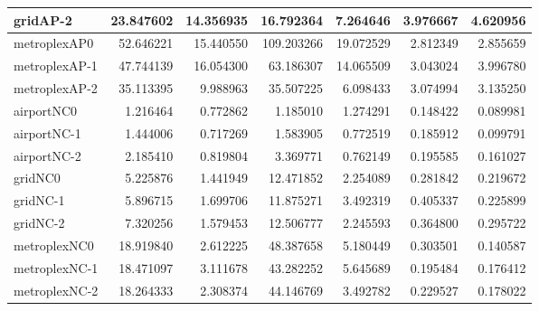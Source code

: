 \begin{longtable}{|l|r|r|r|r|r|r|}
gridAP-2 & 23.847602 & 14.356935 & 16.792364 & 7.264646 & 3.976667 & 4.620956 \\ \hline
metroplexAP0 & 52.646221 & 15.440550 & 109.203266 & 19.072529 & 2.812349 & 2.855659 \\ \hline
metroplexAP-1 & 47.744139 & 16.054300 & 63.186307 & 14.065509 & 3.043024 & 3.996780 \\ \hline
metroplexAP-2 & 35.113395 & 9.988963 & 35.507225 & 6.098433 & 3.074994 & 3.135250 \\ \hline
airportNC0 & 1.216464 & 0.772862 & 1.185010 & 1.274291 & 0.148422 & 0.089981 \\ \hline
airportNC-1 & 1.444006 & 0.717269 & 1.583905 & 0.772519 & 0.185912 & 0.099791 \\ \hline
airportNC-2 & 2.185410 & 0.819804 & 3.369771 & 0.762149 & 0.195585 & 0.161027 \\ \hline
gridNC0 & 5.225876 & 1.441949 & 12.471852 & 2.254089 & 0.281842 & 0.219672 \\ \hline
gridNC-1 & 5.896715 & 1.699706 & 11.875271 & 3.492319 & 0.405337 & 0.225899 \\ \hline
gridNC-2 & 7.320256 & 1.579453 & 12.506777 & 2.245593 & 0.364800 & 0.295722 \\ \hline
metroplexNC0 & 18.919840 & 2.612225 & 48.387658 & 5.180449 & 0.303501 & 0.140587 \\ \hline
metroplexNC-1 & 18.471097 & 3.111678 & 43.282252 & 5.645689 & 0.195484 & 0.176412 \\ \hline
metroplexNC-2 & 18.264333 & 2.308374 & 44.146769 & 3.492782 & 0.229527 & 0.178022 \\ \hline
\end{longtable}
